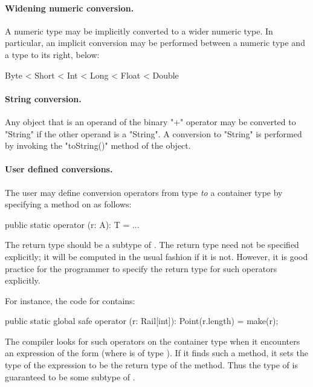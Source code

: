 \paragraph{Widening numeric conversion.}
A numeric type may be implicitly converted to a wider numeric type. In
particular, an implicit conversion may be performed between a numeric
type and a type to its right, below:

\begin{xten}
Byte < Short < Int < Long < Float < Double
\end{xten}


\paragraph{String conversion.}
Any object that is an operand of the binary
\xcd"+" operator may
be converted to \xcd"String" if the other operand is a \xcd"String".
A conversion to \xcd"String" is performed by invoking the \xcd"toString()"
method of the object.


\paragraph{User defined conversions.}\label{sec:user-defined-conversions}

The user may define conversion operators from type  {\em to} a
container type  by specifying a method on  as follows:

\begin{xten}
  public static operator (r: A): T = ... 
\end{xten}

The return type  should be a subtype of . The return
type need not be specified explicitly; it will be computed in the
usual fashion if it is not. However, it is good practice for the
programmer to specify the return type for such operators explicitly.

For instance, the code for  contains:

\begin{xten}
  public static global safe operator (r: Rail[int]): Point(r.length) = make(r);
\end{xten}

The compiler looks for such operators on the container type 
when it encounters an expression of the form  (where
 is of type ). If it finds such a method, it sets the
type of the expression  to be the return type of the
method. Thus the type of  is guaranteed to be some subtype
of .

